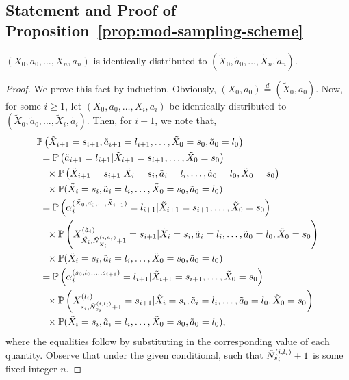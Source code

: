 \documentclass[twoside,11pt]{article}
\newcommand{\pow}[1]{^{(#1)}}%
\numberwithin{equation}{section}
\newcommand{\lp}{\left(}
\newcommand{\rp}{\right)}
\newcommand{\Pbb}{\mathbb{P}}
\newcommand{\prob}{\Pbb}
\begin{document}
\subsection{Statement and Proof of Proposition~\ref{prop:mod-sampling-scheme}}
\label{sec:prop_sampling}
\begin{proposition}\label{prop:mod-sampling-scheme}
   $\lp X_0,a_0,\dots,X_n,a_n\rp$ is identically distributed to $\lp \tilde X_0,\tilde a_0,\dots,\tilde X_n,\tilde a_n\rp$.
\end{proposition}
\begin{proof}
We prove this fact by induction. 
Obviously, $(X_0,a_0)\overset{d}{=}(\tilde X_0,\tilde{a_0})$.
Now, for some $i\geq 1$, let $\lp X_0,a_0,\dots,X_i,a_i\rp$ be identically distributed to $\lp \tilde X_0,\tilde a_0,\dots,\tilde X_i,\tilde a_i\rp$. Then, for $i+1$, we note that,
\begin{align*}
    & \prob\lp \tilde X_{i+1}=s_{i+1},\tilde a_{i+1}=l_{i+1},\dots,\tilde X_0=s_0,\tilde a_0=l_0 \rp\\
    & \ =\prob\lp \tilde a_{i+1}=l_{i+1}| \tilde X_{i+1}=s_{i+1},\dots,\tilde X_0=s_0\rp\\ 
    &\quad \times\prob\lp \tilde X_{i+1}=s_{i+1}|\tilde X_i=s_i,\tilde a_{i}=l_i,\dots,\tilde a_0=l_0,\tilde X_0=s_0\rp\\
    &\quad \times \prob(\tilde X_i=s_i,\tilde a_i=l_i,\dots,\tilde X_0=s_0,\tilde a_0=l_0)\\
    & \ =\prob\lp  \alpha_i\pow{\tilde X_0,\tilde{a_0},\dots,\tilde X_{i+1}}=l_{i+1}| \tilde X_{i+1}=s_{i+1},\dots,\tilde X_0=s_0\rp\\
    &\quad \times \prob\lp X_{\Tilde{X_i},\Tilde{N}_{\Tilde{X_i}}^{(i,\tilde a_i)}+1}\pow{\tilde a_i}=s_{i+1}|\tilde X_i=s_i,\tilde a_{i}=l_i,\dots,\tilde a_0=l_0,\tilde X_0=s_0\rp\\
    &\quad \times \prob(\tilde X_i=s_i,\tilde a_i=l_i,\dots,\tilde X_0=s_0,\tilde a_0=l_0)\\
    & \ =\prob\lp  \alpha_i\pow{s_0,l_0,\dots,s_{i+1}}=l_{i+1}| \tilde X_{i+1}=s_{i+1},\dots,\tilde X_0=s_0\rp\\
    &\quad \times \prob\lp X_{s_i,\Tilde{N}_{s_i}^{(i,l_i)}+1}\pow{l_i}=s_{i+1}|\tilde X_i=s_i,\tilde a_{i}=l_i,\dots,\tilde a_0=l_0,\tilde X_0=s_0\rp\\
    &\quad \times \prob(\tilde X_i=s_i,\tilde a_i=l_i,\dots,\tilde X_0=s_0,\tilde a_0=l_0),
\end{align*}
where the equalities follow by substituting in the corresponding value of each quantity. Observe that under the given conditional, such that $\Tilde{N}_{s_i}^{(i,l_i)}+1$ is some fixed integer $n$. 

\end{proof}
\end{document}
